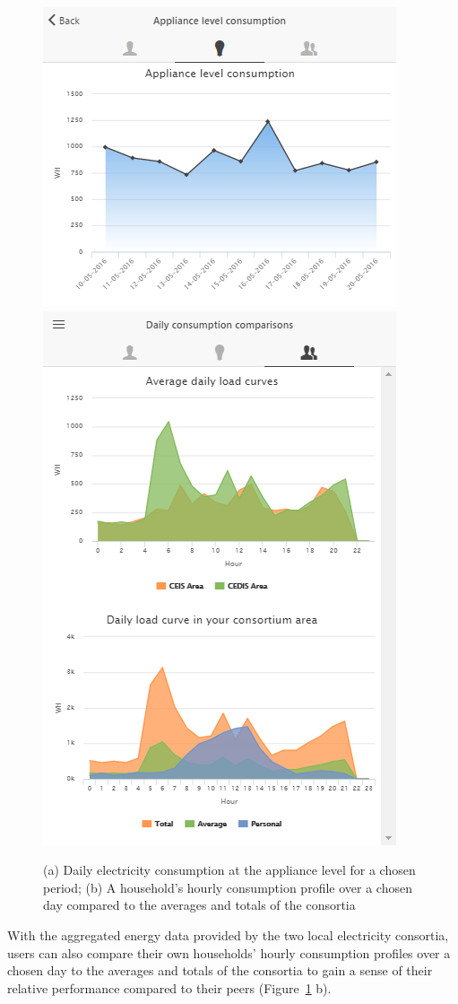\begin{figure}[t]
      \sidecaption[t]
        \includegraphics[width=.35\linewidth]{img/applianceconsumption.png}
         \includegraphics[width=.25\linewidth]{img/benchmark.png}
      \caption{(a) Daily electricity consumption at the appliance level for a chosen period;  (b) 
      A household's hourly consumption profile over a chosen day compared to the averages and totals of the consortia}

\label{fig:viz_hist}
\end{figure}
With the aggregated energy data provided by the two local electricity consortia, users can also  compare their own households' hourly consumption profiles over a chosen day to the averages and totals of the consortia to gain a sense of their relative performance compared to their peers (Figure~\ref{fig:viz_hist} b).

